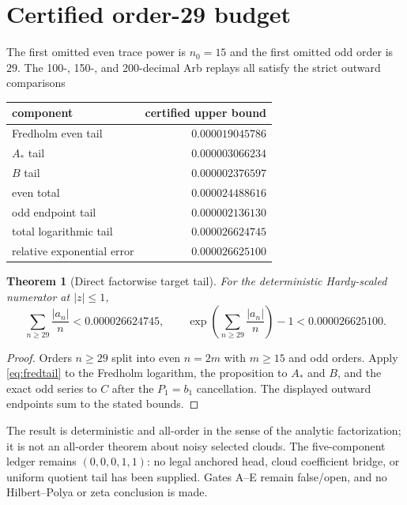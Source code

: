 \documentclass[11pt]{article}
\newtheorem{theorem}{Theorem}[section]
\theoremstyle{remark}\newtheorem{remark}[theorem]{Remark}
\begin{document}
\section{Certified order-29 budget}
The first omitted even trace power is $n_0=15$ and the first omitted odd order
is $29$.  The 100-, 150-, and 200-decimal Arb replays all satisfy the strict
outward comparisons
\begin{center}
\begin{tabular}{lr}
\toprule
component & certified upper bound\\
\midrule
Fredholm even tail & $0.000019045786$\\
$A_*$ tail & $0.000003066234$\\
$B$ tail & $0.000002376597$\\
even total & $0.000024488616$\\
odd endpoint tail & $0.000002136130$\\
total logarithmic tail & $0.000026624745$\\
relative exponential error & $0.000026625100$\\
\bottomrule
\end{tabular}
\end{center}

\begin{theorem}[Direct factorwise target tail]\label{thm:tail}
For the deterministic Hardy-scaled numerator at $|z|\le1$,
\[
 \sum_{n\ge29}\frac{|a_n|}{n}<0.000026624745,
 \qquad
 \exp\!\left(\sum_{n\ge29}\frac{|a_n|}{n}\right)-1
 <0.000026625100.
\]
\end{theorem}

\begin{proof}
Orders $n\ge29$ split into even $n=2m$ with $m\ge15$ and odd orders.
Apply \eqref{eq:fredtail} to the Fredholm logarithm, the proposition to
$A_*$ and $B$, and the exact odd series to $C$ after the $P_1=b_1$
cancellation.  The displayed outward endpoints sum to the stated bounds.
\end{proof}

The result is deterministic and all-order in the sense of the analytic
factorization; it is not an all-order theorem about noisy selected clouds.
The five-component ledger remains $(0,0,0,1,1)$: no legal anchored head,
cloud coefficient bridge, or uniform quotient tail has been supplied.  Gates
A--E remain false/open, and no Hilbert--Polya or zeta conclusion is made.


\end{document}
